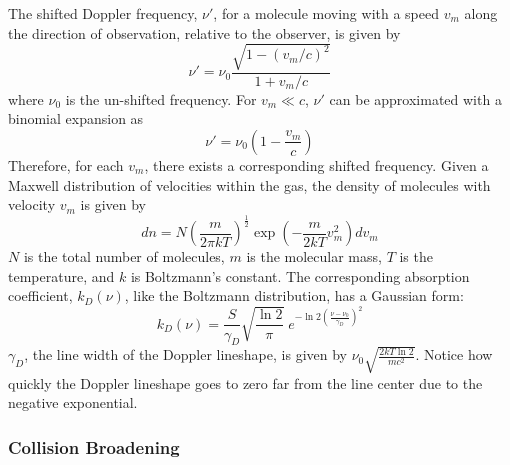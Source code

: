 \documentclass[11pt]{article}
\begin{document}
The shifted Doppler frequency, $\nu '$, for a molecule moving with a
speed $v_{m}$ along the direction of observation, relative to the observer,
is given by
\begin{equation}
 \nu '=\nu_{0}\frac{\sqrt{1-(v_{m}/c)^{2}}}{1+v_{m}/c}
\end{equation}
where $\nu_{0}$ is the un-shifted frequency. For $v_{m} \ll c$, $\nu '$
can be approximated with a binomial expansion as
\begin{equation}
 \nu '=\nu_{0}\left(1-\frac{v_{m}}{c}\right)
\end{equation}
Therefore, for each $v_{m}$, there exists a corresponding shifted frequency.
Given a Maxwell distribution of velocities within the gas, the density of
molecules with velocity $v_{m}$ is given by
\begin{equation}
 dn=N\left(\frac{m}{2\pi kT}\right)^{\frac{1}{2}}\exp\left(-\frac{m}{2kT}
v_{m}^{2}\right)dv_{m}
\end{equation}
$N$ is the total number of molecules, $m$ is the molecular mass, $T$ is the
temperature, and $k$ is Boltzmann's constant.  The corresponding absorption
coefficient, $k_{D}(\nu)$, like the Boltzmann distribution, has a
Gaussian form:
\begin{equation}
 k_{D}(\nu)=\frac{S}{\gamma_{D}}\sqrt{\frac{\ln 2}{\pi}} \; e^{-\ln 2
  \left(\frac{\nu -\nu_{0}}{\gamma_{D}}\right)^{2}}
\end{equation}
$\gamma_{D}$, the line width of the Doppler lineshape, is given by
$\nu_{0}\sqrt{\frac{2kT \ln 2}{mc^{2}}}$.    Notice how quickly the
Doppler lineshape goes to zero far from the line center due to the negative
exponential.  

\subsubsection{Collision Broadening}\label{sec:collision}
\end{document}
